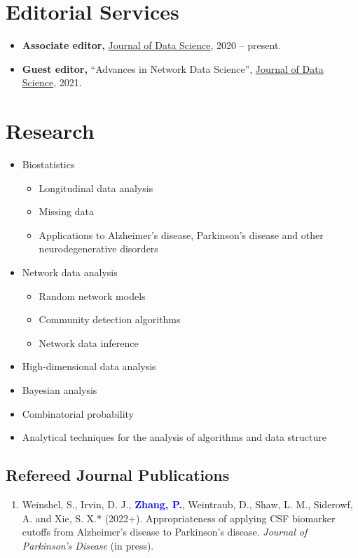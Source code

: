 \documentclass{res}
\newcommand{\PZnot}{\textbf{\textcolor{blue}{Zhang, P.}}}
\begin{document}
\begin{resume}
\section{Editorial Services}
\begin{itemize}
	\item \textbf{Associate editor,} 
	\href{https://jds-online.org/journal/JDS}{Journal of Data 
		Science}, 2020 -- present.
	\item \textbf{Guest editor,} ``Advances in Network Data 
	Science'', \href{https://jds-online.org/journal/JDS}{Journal of 
		Data Science}, 2021.
\end{itemize}
	
\section{Research}
\begin{itemize}
	\item Biostatistics
	\begin{itemize}
		\item Longitudinal data analysis
		\item Missing data
		\item Applications to Alzheimer's disease, Parkinson's 
		disease and other neurodegenerative disorders
	\end{itemize}
	\item Network data analysis
	\begin{itemize}
		\item Random network models
		\item Community detection algorithms
		\item Network data inference
	\end{itemize}
	\item High-dimensional data analysis 
	\item Bayesian analysis
	\item Combinatorial probability
	\item Analytical techniques for the analysis of algorithms and 
	data structure
\end{itemize}

\subsection{Refereed Journal Publications}
\begin{enumerate}
	\item {\sc Weinshel, S., Irvin, D. J.,} \PZnot, {\sc Weintraub, 
	D., Shaw, L. M., Siderowf, A. and Xie, S. X.*} (2022+). 
	Appropriateness of applying CSF biomarker cutoffs from 
	Alzheimer’s disease to Parkinson’s disease. {\em Journal of 
	Parkinson's Disease} (in press).
	

\end{enumerate}
\end{resume}
\end{document}
